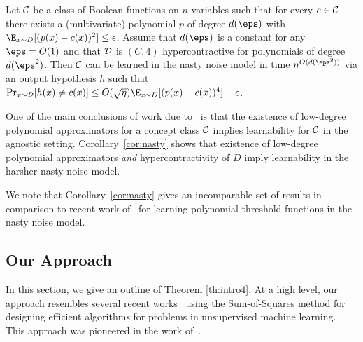 \begin{corollary} \label{cor:nasty}
Let ${\cal C}$ be a class of Boolean functions on $n$ variables such that for every $c \in {\cal C}$ there exists a (multivariate) polynomial $p$ of degree $d(\eps)$ with $\E_{x \sim D}[(p(x) - c(x))^2] \leq \epsilon$.  Assume that $d(\eps)$ is a constant for any $\eps = O(1)$ and that ${\cal D}$ is $(C,4)$ hypercontractive for polynomials of degree $d(\eps^2)$.  Then ${\cal C}$ can be learned in the nasty noise model in time $n^{O(d(\eps^2))}$ via an output hypothesis $h$ such that $\Pr_{x \sim {\cal D}}[h(x) \neq c(x)] \leq O(\sqrt{\eta}) \E_{x \sim D}[(p(x) - c(x))^4] + \epsilon$.  
\end{corollary}
One of the main conclusions of work due to~\citet{DBLP:journals/siamcomp/KalaiKMS08} is that the existence of low-degree polynomial approximators for a concept class ${\cal C}$ implies learnability for ${\cal C}$ in the agnostic setting.  Corollary~\ref{cor:nasty} shows that existence of low-degree polynomial approximators {\em and} hypercontractivity of $D$ imply learnability in the harsher nasty noise model. 

We note that Corollary~\ref{cor:nasty} gives an incomparable set of results in comparison to recent work of~\citet{DBLP:journals/corr/DiakonikolasKS17} for learning polynomial threshold functions in the nasty noise model.  %

\subsection{Our Approach} \label{sec:overview}
In this section, we give an outline of Theorem \ref{th:intro4}. At a high level, our approach resembles several recent works~\cite{DBLP:journals/corr/MaSS16,DBLP:conf/colt/BarakM16,DBLP:conf/colt/PotechinS17,DBLP:journals/corr/abs-1711-11581,HopkinsLi17} using the Sum-of-Squares method for designing efficient algorithms for problems in unsupervised machine learning. This approach was pioneered in the work of~\cite{MR3388192-Barak15}.%


